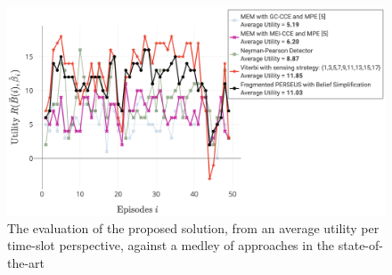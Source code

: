 \documentclass[12pt, draftcls, onecolumn]{IEEEtran}
\begin{document}
\begin{figure} [htb]
    \centerline{
    \includegraphics[width = 1.0\textwidth]{PerformanceEvaluation.png}}
    \caption{The evaluation of the proposed solution, from an average utility per time-slot perspective, against a medley of approaches in the state-of-the-art}
    \label{Fig. 5}
\end{figure}
\end{document}
